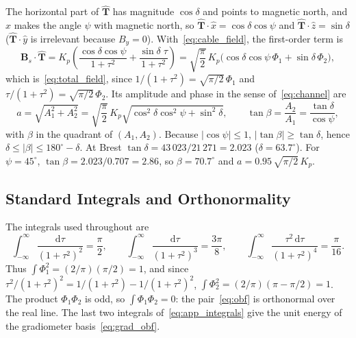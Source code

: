 The horizontal part of $\hat{\mathbf{T}}$ has magnitude $\cos\delta$ and points to magnetic north, and $\hat{x}$ makes the angle $\psi$ with magnetic north, so $\hat{\mathbf{T}}\cdot\hat{x} = \cos\delta\cos\psi$ and $\hat{\mathbf{T}}\cdot\hat{z} = \sin\delta$ ($\hat{\mathbf{T}}\cdot\hat{y}$ is irrelevant because $B_y = 0$). With~\eqref{eq:cable_field}, the first-order term is
\begin{equation}
    \mathbf{B}_s\cdot\hat{\mathbf{T}}
    = K_p\left( \frac{\cos\delta\cos\psi}{1+\tau^{2}} + \frac{\sin\delta\;\tau}{1+\tau^{2}} \right)
    = \sqrt{\frac{\pi}{2}}\,K_p\big( \cos\delta\cos\psi\,\Phi_1 + \sin\delta\,\Phi_2 \big),
    \label{eq:app_first_order}
\end{equation}
which is~\eqref{eq:total_field}, since $1/(1+\tau^{2}) = \sqrt{\pi/2}\,\Phi_1$ and $\tau/(1+\tau^{2}) = \sqrt{\pi/2}\,\Phi_2$. Its amplitude and phase in the sense of~\eqref{eq:channel} are
\begin{equation}
    a = \sqrt{A_1^{2} + A_2^{2}} = \sqrt{\frac{\pi}{2}}\,K_p\sqrt{\cos^{2}\delta\cos^{2}\psi + \sin^{2}\delta},
    \qquad
    \tan\beta = \frac{A_2}{A_1} = \frac{\tan\delta}{\cos\psi},
    \label{eq:app_phase}
\end{equation}
with $\beta$ in the quadrant of $(A_1, A_2)$. Because $|\cos\psi| \le 1$, $|\tan\beta| \ge \tan\delta$, hence $\delta \le |\beta| \le 180^{\circ} - \delta$. At Brest $\tan\delta = 43\,023/21\,271 = 2.023$ ($\delta = 63.7^{\circ}$). For $\psi = 45^{\circ}$, $\tan\beta = 2.023/0.707 = 2.86$, so $\beta = 70.7^{\circ}$ and $a = 0.95\,\sqrt{\pi/2}\,K_p$.

\subsection{Standard Integrals and Orthonormality}\label{app:obf_integrals}

The integrals used throughout are
\begin{equation}
    \int_{-\infty}^{\infty}\frac{\mathrm{d}\tau}{(1+\tau^{2})^{2}} = \frac{\pi}{2},
    \qquad
    \int_{-\infty}^{\infty}\frac{\mathrm{d}\tau}{(1+\tau^{2})^{3}} = \frac{3\pi}{8},
    \qquad
    \int_{-\infty}^{\infty}\frac{\tau^{2}\,\mathrm{d}\tau}{(1+\tau^{2})^{4}} = \frac{\pi}{16}.
    \label{eq:app_integrals}
\end{equation}
Thus $\int\Phi_1^{2} = (2/\pi)(\pi/2) = 1$, and since $\tau^{2}/(1+\tau^{2})^{2} = 1/(1+\tau^{2}) - 1/(1+\tau^{2})^{2}$, $\int\Phi_2^{2} = (2/\pi)(\pi - \pi/2) = 1$. The product $\Phi_1\Phi_2$ is odd, so $\int\Phi_1\Phi_2 = 0$: the pair~\eqref{eq:obf} is orthonormal over the real line. The last two integrals of~\eqref{eq:app_integrals} give the unit energy of the gradiometer basis~\eqref{eq:grad_obf}.


